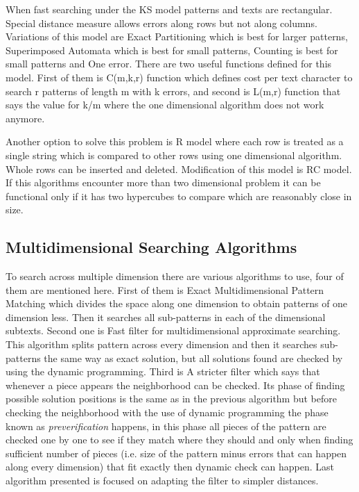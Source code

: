 When fast searching under the KS model patterns and texts are rectangular. Special distance measure allows errors along rows but not along columns. Variations of this model are Exact Partitioning which is best for larger patterns, Superimposed Automata which is best for small patterns, Counting is best for small patterns and One error. There are two useful functions defined for this model. First of them is C(m,k,r) function which defines cost per text character to search r patterns of length m with k errors, and second is L(m,r) function that says the value for k/m where the one dimensional algorithm does not work anymore.

Another option to solve this problem is R model where each row is treated as a single string which is compared to other rows using one dimensional algorithm. Whole rows can be inserted and deleted. Modification of this model is RC model. If this algorithms encounter more than two dimensional problem it can be functional only if it has two hypercubes to compare which are reasonably close in size.


\subsection{Multidimensional Searching Algorithms}
To search across multiple dimension there are various algorithms to use, four of them are mentioned here. First of them is Exact Multidimensional Pattern Matching which divides the space along one dimension to obtain patterns of one dimension less. Then it searches all sub-patterns in each of the dimensional subtexts.
Second one is Fast filter for multidimensional approximate searching. This algorithm splits pattern across every dimension and then it searches sub-patterns the same way as exact solution, but all solutions found are checked by using the dynamic programming. Third is A stricter filter which says that whenever a piece appears the neighborhood can be checked. Its phase of finding possible solution positions is the same as in the previous algorithm but before checking the neighborhood with the use of dynamic programming the phase known as \textit{preverification} happens, in this phase all pieces of the pattern are checked one by one to see if they match where they should and only when finding sufficient number of pieces (i.e. size of the pattern minus errors that can happen along every dimension) that fit exactly then dynamic check can happen. Last algorithm presented is focused on adapting the filter to simpler distances. \cite{mdApproxPM}

